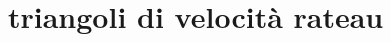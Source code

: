 \documentclass[a4paper, 15pt]{article}
\begin{document}
%	
\section{triangoli di velocità rateau}
\end{document}
